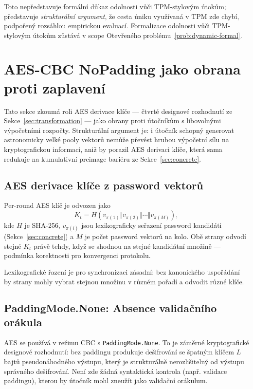 \documentclass[11pt,a4paper]{article}
\begin{document}
Toto nepředstavuje formální důkaz odolnosti vůči TPM-stylovým útokům; představuje \emph{strukturální argument}, že cesta úniku využívaná v TPM zde chybí, podpořený rozsáhlou empirickou evaluací. Formalizace odolnosti vůči TPM-stylovým útokům zůstává v scope Otevřeného problému~\ref{prob:dynamic-formal}.

\section{AES-CBC NoPadding jako obrana proti zaplavení}\label{sec:aes}

Tato sekce zkoumá roli AES derivace klíče --- čtvrté designové rozhodnutí ze Sekce~\ref{sec:transformation} --- jako obrany proti útočníkům s libovolnými výpočetními rozpočty. Strukturální argument je: i útočník schopný generovat astronomicky velké pooly vektorů nemůže převést hrubou výpočetní sílu na kryptografickou informaci, aniž by porazil AES derivaci klíče, která sama redukuje na kumulativní preimage bariéru ze Sekce~\ref{sec:concrete}.

\subsection{AES derivace klíče z password vektorů}

Per-round AES klíč je odvozen jako
\[
K_t = H(v_{\pi(1)} \Vert v_{\pi(2)} \Vert \cdots \Vert v_{\pi(M)}),
\]
kde $H$ je SHA-256, $v_{\pi(i)}$ jsou lexikograficky seřazení password kandidáti (Sekce~\ref{sec:concrete}) a $M$ je počet password vektorů na kolo. Obě strany odvodí stejné $K_t$ právě tehdy, když se shodnou na stejné kandidátní množině --- podmínka korektnosti pro konvergenci protokolu.

Lexikografické řazení je pro synchronizaci zásadní: bez kanonického uspořádání by strany mohly vybrat stejnou množinu v různém pořadí a odvodit různé klíče.

\subsection{PaddingMode.None: Absence validačního orákula}

AES se používá v režimu CBC s \texttt{PaddingMode.None}. To je záměrné kryptografické designové rozhodnutí: bez paddingu produkuje dešifrování se špatným klíčem $L$ bajtů pseudonáhodného výstupu, který je strukturálně nerozlišitelný od výstupu správného dešifrování. Není zde žádná syntaktická kontrola (např. validace paddingu), kterou by útočník mohl zneužít jako validační orákulum.
\end{document}
